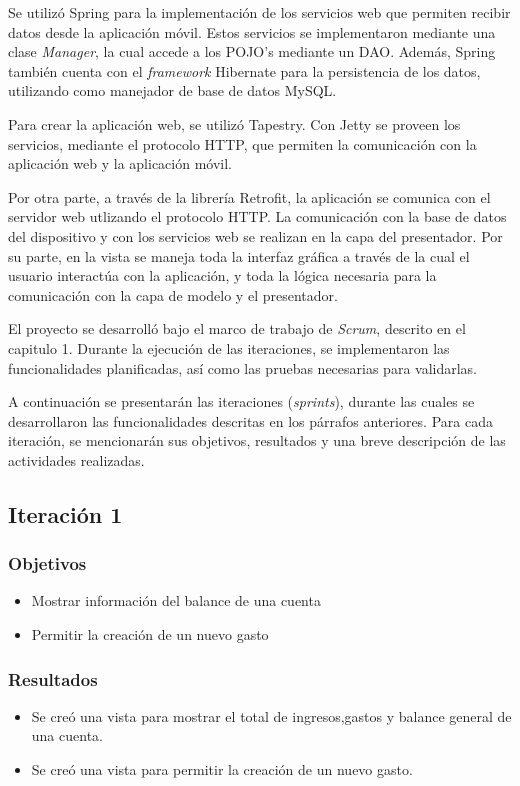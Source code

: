 Se utilizó Spring para la implementación de los servicios web que permiten recibir datos desde la aplicación móvil. Estos servicios se implementaron mediante una clase \textit{Manager}, la cual accede a los POJO's mediante un DAO. Además, Spring también cuenta con el \textit{framework} Hibernate para la persistencia de los datos, utilizando como manejador de base de datos MySQL.

Para crear la aplicación web, se utilizó Tapestry. Con Jetty se proveen los servicios, mediante el protocolo HTTP, que permiten la comunicación con la aplicación web y la aplicación  móvil.

Por otra parte, a través de la librería Retrofit, la aplicación se comunica con el servidor web utlizando el protocolo HTTP. La comunicación con la base de datos del dispositivo y con los servicios web se realizan en la capa del presentador. Por su parte, en la vista se maneja toda la interfaz gráfica a través de la cual el usuario interactúa con la aplicación, y toda la lógica necesaria para la comunicación con la capa de modelo y el presentador.

El proyecto se desarrolló bajo el marco de trabajo de \textit{Scrum}, descrito en el capitulo 1. Durante la ejecución de las iteraciones, se implementaron las funcionalidades planificadas, así como las pruebas necesarias para validarlas.

A continuación se presentarán las iteraciones (\textit{sprints}), durante las cuales se desarrollaron las funcionalidades descritas en los párrafos anteriores. Para cada iteración, se mencionarán sus objetivos, resultados y una breve descripción de las actividades realizadas.

\subsection{Iteración 1}

\subsubsection{Objetivos}
	\begin{itemize}
	\item Mostrar información del balance de una cuenta
	\item Permitir la creación de un nuevo gasto
	\end{itemize}

\subsubsection{Resultados}
\begin{itemize}
\item Se creó una vista para mostrar el total de ingresos,gastos y balance general de una cuenta.
\item Se creó una vista para permitir la creación de un nuevo gasto.
\end{itemize}


